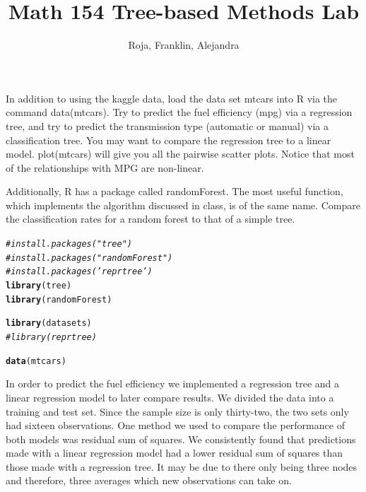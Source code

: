 \documentclass{article}\usepackage[]{graphicx}\usepackage[]{color}
\makeatletter
\newcommand{\hlcom}[1]{\textcolor[rgb]{0.678,0.584,0.686}{\textit{#1}}}%
\newcommand{\hlstd}[1]{\textcolor[rgb]{0.345,0.345,0.345}{#1}}%
\newcommand{\hlkwd}[1]{\textcolor[rgb]{0.737,0.353,0.396}{\textbf{#1}}}%
\newenvironment{kframe}{%
 \def\at@end@of@kframe{}%
 \ifinner\ifhmode%
  \def\at@end@of@kframe{\end{minipage}}%
  \begin{minipage}{\columnwidth}%
 \fi\fi%
 \def\FrameCommand##1{\hskip\@totalleftmargin \hskip-\fboxsep
 \colorbox{shadecolor}{##1}\hskip-\fboxsep
     \hskip-\linewidth \hskip-\@totalleftmargin \hskip\columnwidth}%
 \MakeFramed {\advance\hsize-\width
   \@totalleftmargin\z@ \linewidth\hsize
   \@setminipage}}%
 {\par\unskip\endMakeFramed%
 \at@end@of@kframe}
\newenvironment{knitrout}{}{} %
\makeatother
\begin{document}
\title{Math 154 Tree-based Methods Lab}
\author{Roja, Franklin, Alejandra}
\maketitle

In addition to using the kaggle data, load the data set mtcars into R via the
command data(mtcars). Try to predict the fuel efficiency (mpg) via a regression tree, and try to predict the transmission type (automatic or manual) via a classification
tree.
You may want to compare the regression tree to a linear model.
plot(mtcars) will give you all the pairwise scatter plots. Notice that most of the
relationships with MPG are non-linear.

Additionally, R has a package called randomForest. The most useful function,
which implements the algorithm discussed in class, is of the same name. Compare
the classification rates for a random forest to that of a simple tree.

\begin{knitrout}
\color{fgcolor}\begin{kframe}
\begin{alltt}
\hlcom{# install.packages("tree")}
\hlcom{# install.packages("randomForest")}
\hlcom{# install.packages('reprtree')}
\hlkwd{library}\hlstd{(tree)}
\hlkwd{library}\hlstd{(randomForest)}
\end{alltt}


{\ttfamily\noindent\itshape\color{messagecolor}{\#\# randomForest 4.6-12}}

{\ttfamily\noindent\itshape\color{messagecolor}{\#\# Type rfNews() to see new features/changes/bug fixes.}}\begin{alltt}
\hlkwd{library}\hlstd{(datasets)}
\hlcom{# library(reprtree)}

\hlkwd{data}\hlstd{(mtcars)}
\end{alltt}
\end{kframe}
\end{knitrout}


In order to predict the fuel efficiency we implemented a regression tree and  a linear regression model to later compare results. We divided the data into a training and test set. Since the sample size is only thirty-two, the two sets only had sixteen observations. One method we used to compare the performance of both models was residual sum of squares. We consistently found that predictions made with a linear regression model had a lower residual sum of squares than those made with a regression tree. It may be due to there only being three nodes and therefore, three averages which new observations can take on. 
\end{document}
